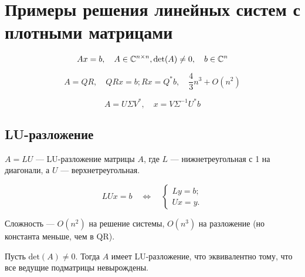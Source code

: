 \section{Примеры решения линейных систем с плотными матрицами}

\[
    A x = b, \quad A \in \mathbb{C}^{n \times n}, \textrm{det}(A) \ne 0,
    \quad b \in \mathbb{C}^n
\]

\[
    A = Q R, \quad Q R x = b; R x = Q^* b, \quad \frac{4}{3} n^3 + O(n^2)
\]

\[
    A = U \Sigma V^*, \quad x = V \Sigma^{-1} U^* b
\]

\subsection{LU-разложение}

\begin{definition}
    $A = LU$ --- LU-разложение матрицы $A$, где $L$ --- нижнетреугольная с
    1 на диагонали, а $U$ --- верхнетреугольная.
\end{definition}

\[
    L U x = b \quad\Leftrightarrow\quad \begin{cases}
        L y = b; \\ U x = y.
    \end{cases}
\]

Сложность --- $O(n^2)$ на решение системы, $O(n^3)$ на разложение (но
константа меньше, чем в QR).

\begin{theorem}
    Пусть $\textrm{det}(A) \ne 0$. Тогда $A$ имеет LU-разложение, что
    эквивалентно тому, что все ведущие подматрицы невырождены.
\end{theorem}

